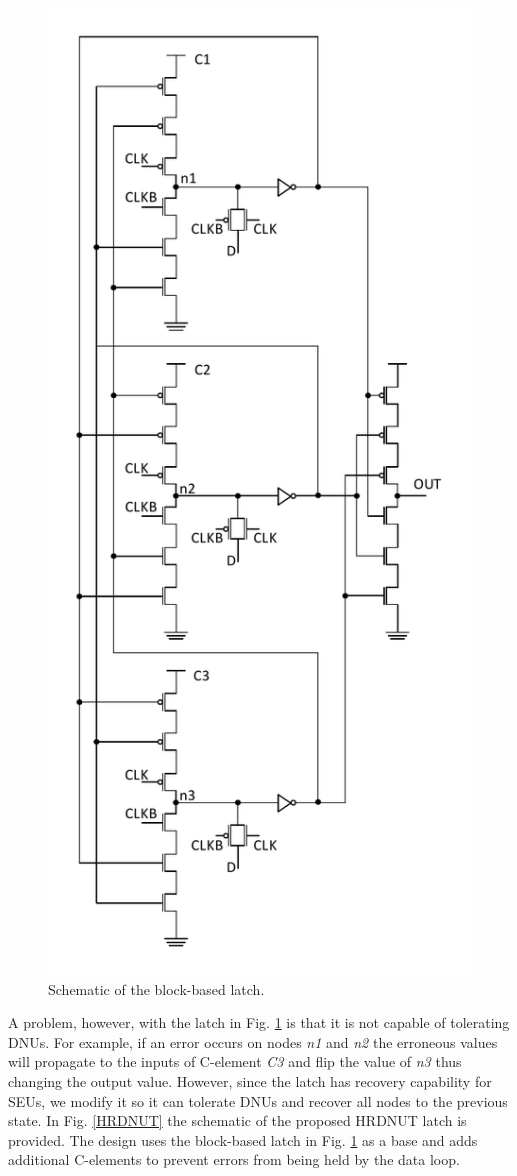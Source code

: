 \begin{figure}[!htbp]
	\centering
	\includegraphics[width=0.55\linewidth]{Figures/BLatch}
	\caption{Schematic of the block-based latch.}
	\label{BLatch}
\end{figure} 

A problem, however, with the latch in Fig. \ref{BLatch} is that it is not capable of tolerating DNUs. For example, if an error occurs on nodes \textit{n1} and \textit{n2} the erroneous values will propagate to the inputs of C-element \textit{C3} and flip the value of \textit{n3} thus changing the output value. However, since the latch has recovery capability for SEUs, we modify it so it can tolerate DNUs and recover all nodes to the previous state. In Fig. \ref{HRDNUT} the schematic of the proposed HRDNUT latch is provided. The design uses the block-based latch in Fig. \ref{BLatch} as a base and adds additional C-elements to prevent errors from being held by the data loop.  

